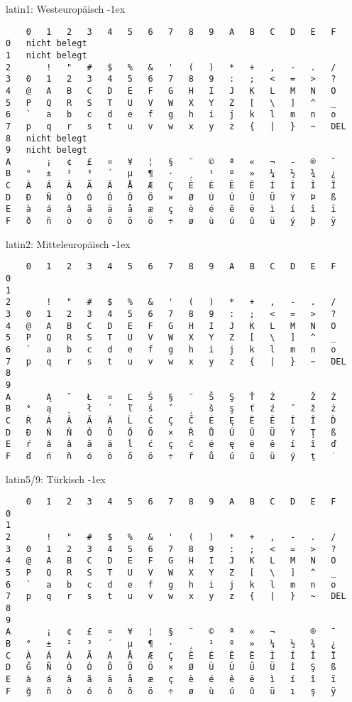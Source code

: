 \begin{frame}[fragile]{latin1: Westeuropäisch}
\kern-1ex\small
\begin{verbatim}
  	0 	1 	2 	3 	4 	5 	6 	7 	8 	9 	A 	B 	C 	D 	E 	F
0 	nicht belegt
1 	nicht belegt
2 	 	! 	" 	# 	$ 	% 	& 	' 	( 	) 	* 	+ 	, 	- 	. 	/
3 	0 	1 	2 	3 	4 	5 	6 	7 	8 	9 	: 	; 	< 	= 	> 	?
4 	@ 	A 	B 	C 	D 	E 	F 	G 	H 	I 	J 	K 	L 	M 	N 	O
5 	P 	Q 	R 	S 	T 	U 	V 	W 	X 	Y 	Z 	[ 	\ 	] 	^ 	_
6 	` 	a 	b 	c 	d 	e 	f 	g 	h 	i 	j 	k 	l 	m 	n 	o
7 	p 	q 	r 	s 	t 	u 	v 	w 	x 	y 	z 	{ 	| 	} 	~ 	DEL
8 	nicht belegt
9 	nicht belegt
A 	  	¡ 	¢ 	£ 	¤ 	¥ 	¦ 	§ 	¨ 	© 	ª 	« 	¬ 	-  	® 	¯
B 	° 	± 	² 	³ 	´ 	µ 	¶ 	· 	¸ 	¹ 	º 	» 	¼ 	½ 	¾ 	¿
C 	À 	Á 	Â 	Ã 	Ä 	Å 	Æ 	Ç 	È 	É 	Ê 	Ë 	Ì 	Í 	Î 	Ï
D 	Ð 	Ñ 	Ò 	Ó 	Ô 	Õ 	Ö 	× 	Ø 	Ù 	Ú 	Û 	Ü 	Ý 	Þ 	ß
E 	à 	á 	â 	ã 	ä 	å 	æ 	ç 	è 	é 	ê 	ë 	ì 	í 	î 	ï
F 	ð 	ñ 	ò 	ó 	ô 	õ 	ö 	÷ 	ø 	ù 	ú 	û 	ü 	ý 	þ 	ÿ
\end{verbatim}
\end{frame}

\begin{frame}[fragile]{latin2: Mitteleuropäisch}
\kern-1ex\small
\begin{verbatim}
  	0 	1 	2 	3 	4 	5 	6 	7 	8 	9 	A 	B 	C 	D 	E 	F
0
1
2 	  	! 	" 	# 	$ 	% 	& 	' 	( 	) 	* 	+ 	, 	- 	. 	/
3 	0 	1 	2 	3 	4 	5 	6 	7 	8 	9 	: 	; 	< 	= 	> 	?
4 	@ 	A 	B 	C 	D 	E 	F 	G 	H 	I 	J 	K 	L 	M 	N 	O
5 	P 	Q 	R 	S 	T 	U 	V 	W 	X 	Y 	Z 	[ 	\ 	] 	^ 	_
6 	` 	a 	b 	c 	d 	e 	f 	g 	h 	i 	j 	k 	l 	m 	n 	o
7 	p 	q 	r 	s 	t 	u 	v 	w 	x 	y 	z 	{ 	| 	} 	~ 	DEL
8 	
9 	
A 	  	Ą 	˘ 	Ł 	¤ 	Ľ 	Ś 	§ 	¨ 	Š 	Ş 	Ť 	Ź 	  	Ž 	Ż
B 	° 	ą 	˛ 	ł 	´ 	ľ 	ś 	ˇ 	¸ 	š 	ş 	ť 	ź 	˝ 	ž 	ż
C 	Ŕ 	Á 	Â 	Ă 	Ä 	Ĺ 	Ć 	Ç 	Č 	É 	Ę 	Ë 	Ě 	Í 	Î 	Ď
D 	Đ 	Ń 	Ň 	Ó 	Ô 	Ő 	Ö 	× 	Ř 	Ů 	Ú 	Ű 	Ü 	Ý 	Ţ 	ß
E 	ŕ 	á 	â 	ă 	ä 	ĺ 	ć 	ç 	č 	é 	ę 	ë 	ě 	í 	î 	ď
F 	đ 	ń 	ň 	ó 	ô 	ő 	ö 	÷ 	ř 	ů 	ú 	ű 	ü 	ý 	ţ 	˙
\end{verbatim}
\end{frame}
\begin{frame}[fragile]{latin5/9: Türkisch}
\kern-1ex\small
\begin{verbatim}
  	0 	1 	2 	3 	4 	5 	6 	7 	8 	9 	A 	B 	C 	D 	E 	F
0
1
2 	  	! 	" 	# 	$ 	% 	& 	' 	( 	) 	* 	+ 	, 	- 	. 	/
3 	0 	1 	2 	3 	4 	5 	6 	7 	8 	9 	: 	; 	< 	= 	> 	?
4 	@ 	A 	B 	C 	D 	E 	F 	G 	H 	I 	J 	K 	L 	M 	N 	O
5 	P 	Q 	R 	S 	T 	U 	V 	W 	X 	Y 	Z 	[ 	\ 	] 	^ 	_
6 	` 	a 	b 	c 	d 	e 	f 	g 	h 	i 	j 	k 	l 	m 	n 	o
7 	p 	q 	r 	s 	t 	u 	v 	w 	x 	y 	z 	{ 	| 	} 	~ 	DEL
8
9
A 	  	¡ 	¢ 	£ 	¤ 	¥ 	¦ 	§ 	¨ 	© 	ª 	« 	¬ 	  	® 	¯
B 	° 	± 	² 	³ 	´ 	µ 	¶ 	· 	¸ 	¹ 	º 	» 	¼ 	½ 	¾ 	¿
C 	À 	Á 	Â 	Ã 	Ä 	Å 	Æ 	Ç 	È 	É 	Ê 	Ë 	Ì 	Í 	Î 	Ï
D 	Ğ 	Ñ 	Ò 	Ó 	Ô 	Õ 	Ö 	× 	Ø 	Ù 	Ú 	Û 	Ü 	İ 	Ş 	ß
E 	à 	á 	â 	ã 	ä 	å 	æ 	ç 	è 	é 	ê 	ë 	ì 	í 	î 	ï
F 	ğ 	ñ 	ò 	ó 	ô 	õ 	ö 	÷ 	ø 	ù 	ú 	û 	ü 	ı 	ş 	ÿ
\end{verbatim}
\end{frame}

